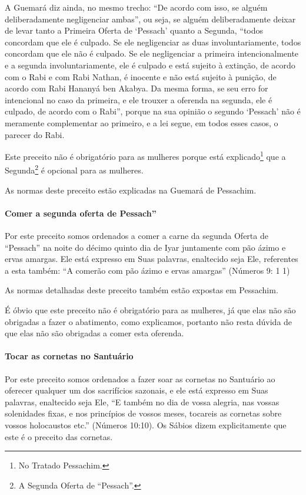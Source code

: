 A Guemará diz ainda, no mesmo trecho: ``De acordo com isso, se alguém
deliberadamente negligenciar ambas'', ou seja, se alguém deliberadamente
deixar de levar tanto a Primeira Oferta de `Pessach' quanto a Segunda,
``todos concordam que ele é culpado. Se ele negligenciar as duas
involuntariamente, todos concordam que ele não é culpado. Se ele
negligenciar a primeira intencionalmente e a segunda involuntariamente,
ele é culpado e está sujeito à extinção, de acordo com o Rabi e com Rabi
Nathan, é inocente e não está sujeito à punição, de acordo com Rabi
Hananyá ben Akabya. Da mesma forma, se seu erro for intencional no caso
da primeira, e ele trouxer a oferenda na segunda, ele é culpado, de
acordo com o Rabi'', porque na sua opinião o segundo `Pessach' não é
meramente complementar ao primeiro, e a lei segue, em todos esses casos,
o parecer do Rabi.

Este preceito não é obrigatório para as mulheres porque está explicado\footnote{No Tratado Pessachim.} que a Segunda\footnote{A Segunda Oferta de ``Pessach''.} é opcional para as mulheres.

As normas deste preceito estão explicadas na Guemará de Pessachim.

\paragraph{Comer a segunda oferta de Pessach''}

Por este preceito somos ordenados a comer a carne da segunda Oferta de
``Pessach'' na noite do décimo quinto dia de Iyar juntamente com pão
ázimo e ervas amargas. Ele está expresso em Suas palavras, enaltecido
seja Ele, referentes a esta também: ``A comerão com pão ázimo e ervas
amargas'' (Números 9: 1 1)

As normas detalhadas deste preceito também estão expostas em Pessachim.

É óbvio que este preceito não é obrigatório para as mulheres, já que
elas não são obrigadas a fazer o abatimento, como explicamos, portanto
não resta dúvida de que elas não são obrigadas a comer esta oferenda.

\paragraph{Tocar as cornetas no Santuário}

Por este preceito somos ordenados a fazer soar as cornetas no Santuário
ao oferecer qualquer um dos sacrifícios sazonais, e ele está expresso em
Suas palavras, enaltecido seja Ele, ``E também no dia de vossa alegria,
nas vossas solenidades fixas, e nos princípios de vossos meses,
tocareis as cornetas sobre vossos holocaustos etc.'' (Números 10:10).
Os Sábios dizem explicitamente que este é o preceito das cornetas.

